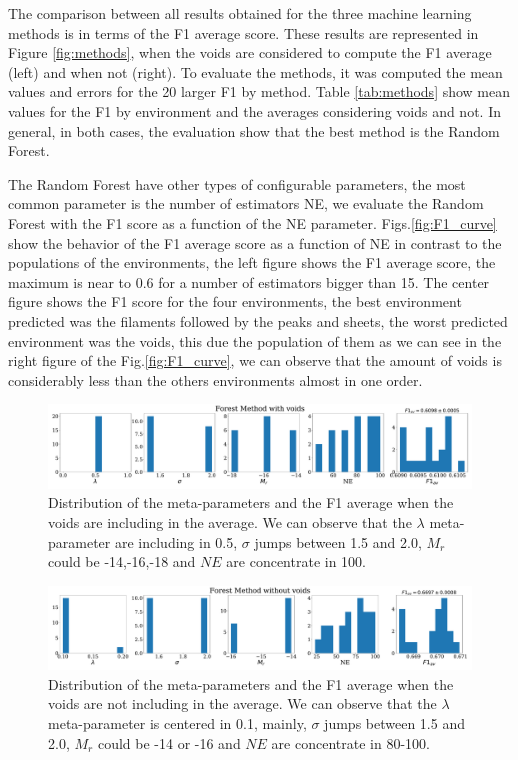 \documentclass[usenatbib]{mnras}
\begin{document}
The comparison between all results obtained for the three machine
learning methods is in terms of the F1 average score. These results
are represented in Figure \ref{fig:methods}, when the voids are
considered to compute the F1 average (left) and when not (right).  
To evaluate the methods, it was computed the mean values and errors
for the 20 larger F1 by method. Table \ref{tab:methods} show mean
values for the F1 by environment and the averages considering voids
and not. 
In general, in both cases, the evaluation show that the best method is
the Random Forest.  

The Random Forest have other types of configurable parameters, the
most common parameter is the number of estimators NE, we evaluate the
Random Forest with the F1 score as a function of the NE parameter.  
Figs.\ref{fig:F1_curve} show the behavior of the F1 average score as a
function of NE in contrast to the populations of the environments, 
the left figure shows the F1 average score,
the maximum is near to 0.6 for a number of estimators bigger than 15.
The center figure shows the F1 score for the four environments,
the best environment predicted was the filaments followed by the peaks and sheets,
the worst predicted environment was the voids,
this due the population of them as we can see in the right figure of the Fig.\ref{fig:F1_curve},
we can observe that the amount of voids is considerably less than the
others environments almost in one order. 

\begin{figure}
\centering
    \includegraphics[scale=0.23]{Figs/p_features_Forest_F1_av.pdf}
    \caption{Distribution of the meta-parameters and the F1 average
      when the voids are including in the average. We can observe that
      the $\lambda$ meta-parameter are including in 0.5, $\sigma$
      jumps between 1.5 and 2.0, $M_r$ could be -14,-16,-18 and $NE$
      are concentrate in 100.} 
    \label{fig:features_void}    
\end{figure}

\begin{figure}
\centering
    \includegraphics[scale=0.23]{Figs/p_features_Forest_F1_av_no_voids.pdf}
    \caption{Distribution of the meta-parameters and the F1 average
      when the voids are not including in the average. We can observe
      that the $\lambda$ meta-parameter is centered in 0.1, mainly,
      $\sigma$ jumps between 1.5 and 2.0, $M_r$ could be -14 or -16
      and $NE$ are concentrate in 80-100.} 
    \label{fig:features_no_void}    
\end{figure}
\end{document}
